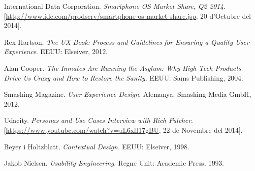 \begin{thebibliography}{9}

International Data Corporation. \textit{Smartphone OS Market Share, Q2 2014}. [\url{http://www.idc.com/prodserv/smartphone-os-market-share.jsp}, 20 d'Octubre del 2014].

Rex Hartson. \textit{The UX Book: Process and Guidelines for Ensuring a Quality User Experience}. EEUU: Elseiver, 2012. %

Alan Cooper. \textit{The Inmates Are Running the Asylum: Why High Tech Products Drive Us Crazy and How to Restore the Sanity}. EEUU: Sams Publishing, 2004.

Smashing Magazine. \textit{User Experience Design}. Alemanya: Smashing Media GmbH, 2012. %

Udacity. \textit{Personas and Use Cases Interview with Rich Fulcher}. [\url{https://www.youtube.com/watch?v=uL6xlI17gBU}, 22 de Novembre del 2014]. 

Beyer i Holtzblatt. \textit{Contextual Design}. EEUU: Elseiver, 1998.

Jakob Nielsen. \textit{Usability Engineering}. Regne Unit: Academic Press, 1993.


\end{thebibliography}
